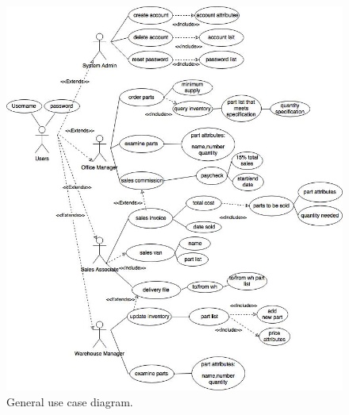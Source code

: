 \documentclass{report}
\begin{document}
\begin{figure}
  \centering
    \includegraphics[width=\textwidth,height=\textheight,keepaspectratio]{../diagrams/image_versions/use_cases.jpg}
  \caption{General use case diagram.}
\end{figure}



\listoffigures

\listoftables
\end{document}
